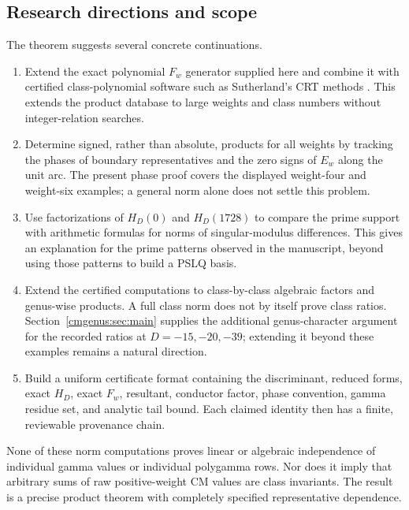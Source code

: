 \subsection{Research directions and scope}

The theorem suggests several concrete continuations.
\begin{enumerate}
\item Extend the exact polynomial $F_w$ generator supplied here and combine it with
certified class-polynomial software such as Sutherland's CRT methods
\cite{cmnorm:Sutherland}. This extends the product database to large
weights and class numbers without integer-relation searches.
\item Determine signed, rather than absolute, products for all weights
by tracking the phases of boundary representatives and the zero signs
of $E_w$ along the unit arc. The present phase proof covers the displayed
weight-four and weight-six examples; a general norm alone does not
settle this problem.
\item Use factorizations of $H_D(0)$ and $H_D(1728)$ to compare the prime
support with arithmetic formulas for norms of singular-modulus
differences. This gives an explanation for the prime patterns observed
in the manuscript, beyond using those patterns to build a PSLQ basis.
\item Extend the certified computations to class-by-class algebraic
factors and genus-wise products. A full class norm does not by itself
prove class ratios. Section~\ref{cmgenus:sec:main} supplies the additional
genus-character argument for the recorded ratios at $D=-15,-20,-39$;
extending it beyond these examples remains a natural direction.
\item Build a uniform certificate format containing the discriminant,
reduced forms, exact $H_D$, exact $F_w$, resultant, conductor factor,
phase convention, gamma residue set, and analytic tail bound. Each
claimed identity then has a finite, reviewable provenance chain.
\end{enumerate}

None of these norm computations proves linear or algebraic independence
of individual gamma values or individual polygamma rows. Nor does it
imply that arbitrary sums of raw positive-weight CM values are class
invariants. The result is a precise product theorem with completely
specified representative dependence.
